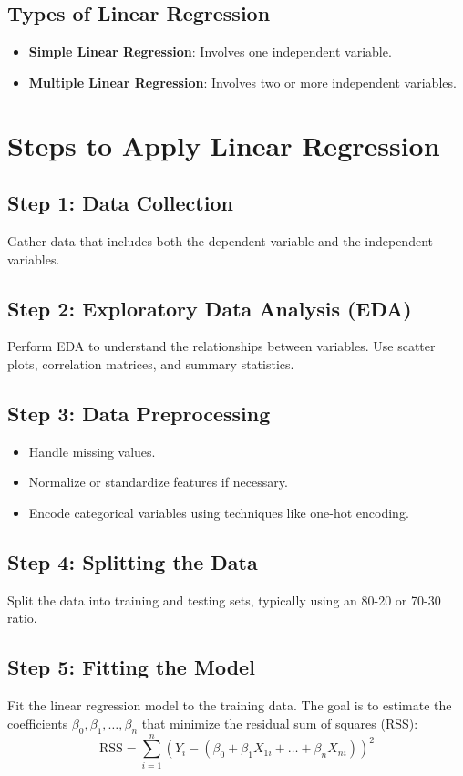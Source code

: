 \documentclass[a4paper,12pt]{article}
\begin{document}
\subsection{Types of Linear Regression}
\begin{itemize}
    \item \textbf{Simple Linear Regression}: Involves one independent variable.
    \item \textbf{Multiple Linear Regression}: Involves two or more independent variables.
\end{itemize}

\section{Steps to Apply Linear Regression}

\subsection{Step 1: Data Collection}
Gather data that includes both the dependent variable and the independent variables.

\subsection{Step 2: Exploratory Data Analysis (EDA)}
Perform EDA to understand the relationships between variables. Use scatter plots, correlation matrices, and summary statistics.

\subsection{Step 3: Data Preprocessing}
\begin{itemize}
    \item Handle missing values.
    \item Normalize or standardize features if necessary.
    \item Encode categorical variables using techniques like one-hot encoding.
\end{itemize}

\subsection{Step 4: Splitting the Data}
Split the data into training and testing sets, typically using an 80-20 or 70-30 ratio.

\subsection{Step 5: Fitting the Model}
Fit the linear regression model to the training data. The goal is to estimate the coefficients $\beta_0, \beta_1, \ldots, \beta_n$ that minimize the residual sum of squares (RSS):
\[
\text{RSS} = \sum_{i=1}^n \left(Y_i - (\beta_0 + \beta_1 X_{1i} + \ldots + \beta_n X_{ni})\right)^2
\]
\end{document}
